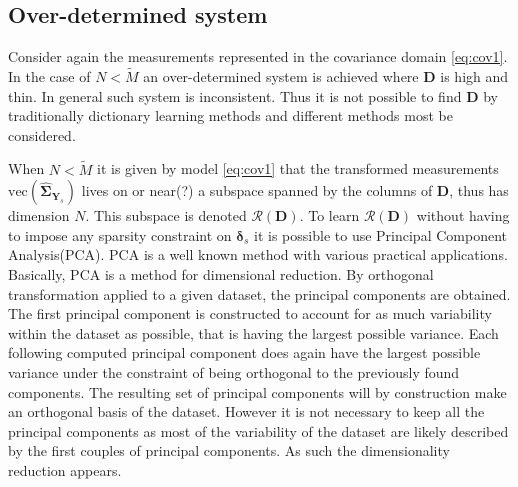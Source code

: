 \subsection{Over-determined system}
Consider again the measurements represented in the covariance domain \eqref{eq:cov1}.
In the case of $N < \widetilde{M}$ an over-determined system is achieved where $\textbf{D}$ is high and thin. In general such system is inconsistent. Thus it is not possible to find $\textbf{D}$ by traditionally dictionary learning methods and different methods most be considered.

When $N < \widetilde{M}$ it is given by model \eqref{eq:cov1} that the transformed measurements $\text{vec}(\widehat{\boldsymbol{\Sigma}}_{\textbf{Y}_s})$ lives on or near(?) a subspace spanned by the columns of $\textbf{D}$, thus has dimension $N$. This subspace is denoted $\mathcal{R}(\textbf{D})$. 
To learn $\mathcal{R}(\textbf{D})$ without having to impose any sparsity constraint on $\boldsymbol{\delta}_s$ it is possible to use Principal Component Analysis(PCA).
PCA is a well known method with various practical applications\cite[p.125]{ICA book}. Basically, PCA is a method for dimensional reduction. By orthogonal transformation applied to a given dataset, the principal components are obtained. The first principal component is constructed to account for as much variability within the dataset as possible, that is having the largest possible variance. Each following computed principal component does again have the largest possible variance under the constraint of being orthogonal to the previously found components. The resulting set of principal components will by construction make an orthogonal basis of the dataset. However it is not necessary to keep all the principal components as most of the variability of the dataset are likely described by the first couples of principal components. As such the dimensionality reduction appears.    
     

